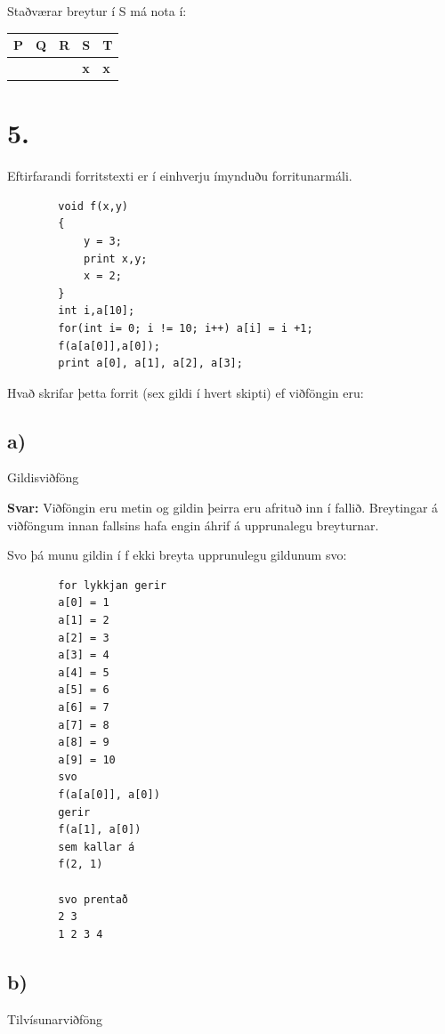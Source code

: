 \documentclass{article}
\newcommand{\sv}{\textbf{Svar:}}
\newcommand{\bo}[1]{\textbf{#1}}
\begin{document}
     Staðværar breytur í S má nota í:

     
     \begin{tabularx}{\textwidth}{ |X|X|X|X|X|}
        \hline
        \textbf{P}  & \textbf{Q}  & \textbf{R}  & \textbf{S}  & \textbf{T} \\ \hline
         & & & \bo{x} & \bo{x} \\ \hline
     \end{tabularx}


     \newpage

     \section{5.}
     Eftirfarandi forritstexti er í einhverju ímynduðu forritunarmáli.
     \begin{verbatim}
        void f(x,y)
        {
            y = 3;
            print x,y;
            x = 2;
        }
        int i,a[10];
        for(int i= 0; i != 10; i++) a[i] = i +1;
        f(a[a[0]],a[0]);
        print a[0], a[1], a[2], a[3];
     \end{verbatim}

     Hvað skrifar þetta forrit (sex gildi í hvert skipti) ef viðföngin eru:

     \subsection{a)} Gildisviðföng 

    \sv 
    Viðföngin eru metin og gildin þeirra eru afrituð inn í fallið. Breytingar á viðföngum innan fallsins hafa engin áhrif á upprunalegu breyturnar.

    Svo þá munu gildin í f ekki breyta upprunulegu gildunum svo:
    \begin{verbatim}
        for lykkjan gerir
        a[0] = 1
        a[1] = 2
        a[2] = 3
        a[3] = 4
        a[4] = 5
        a[5] = 6
        a[6] = 7
        a[7] = 8
        a[8] = 9
        a[9] = 10
        svo 
        f(a[a[0]], a[0])
        gerir
        f(a[1], a[0])
        sem kallar á
        f(2, 1)

        svo prentað
        2 3
        1 2 3 4
    \end{verbatim}


     \subsection{b)} Tilvísunarviðföng
     
\end{document}

